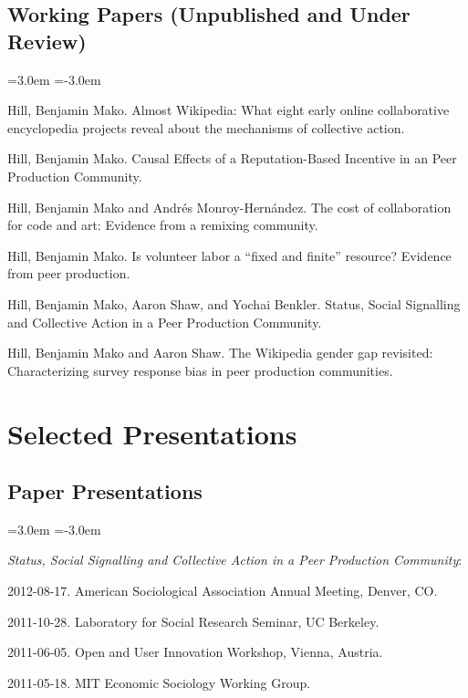 \documentclass[10pt]{article}
\newenvironment{cvlist}{
\begin{list}{}{\leftmargin=3.0em \itemindent=-3.0em}
  \setlength{\itemsep}{0pt}
  \setlength{\parskip}{0em}
  \setlength{\parsep}{1em}
  \setlength{\parindent}{0em}}
{\vspace{1em}
\end{list}}
\begin{document}
\subsection{Working Papers (Unpublished and Under Review)}
\begin{cvlist}
\item Hill, Benjamin Mako. Almost Wikipedia: What eight early online
  collaborative encyclopedia projects reveal about the mechanisms of
  collective action.
\item Hill, Benjamin Mako. Causal Effects of a Reputation-Based
  Incentive in an Peer Production Community.
\item Hill, Benjamin Mako and Andrés Monroy-Hernández. The cost of
  collaboration for code and art: Evidence from a remixing community.
\item Hill, Benjamin Mako. Is volunteer labor a ``fixed and finite''
  resource? Evidence from peer production.
\item Hill, Benjamin Mako, Aaron Shaw, and Yochai Benkler. Status,
  Social Signalling and Collective Action in a Peer Production
  Community.
\item Hill, Benjamin Mako and Aaron Shaw. The Wikipedia gender gap
  revisited: Characterizing survey response bias in peer production
  communities.
\end{cvlist}

\section{Selected Presentations}

\subsection{Paper Presentations}

\begin{cvlist}
\item \emph{Status, Social Signalling and Collective Action in a Peer
  Production Community}:
\item 2012-08-17. American Sociological Association Annual Meeting, Denver, CO.
\item 2011-10-28. Laboratory for Social Research Seminar, UC Berkeley.
\item 2011-06-05. Open and User Innovation Workshop, Vienna, Austria.
\item 2011-05-18. MIT Economic Sociology Working Group.
\end{cvlist}
\end{document}
